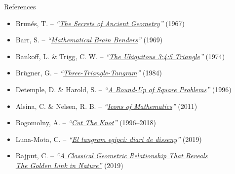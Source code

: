 \documentclass[14pt]{beamer}
\begin{document}

    \begin{frame}[t]{References}
        \begin{center}
            \bigskip
            {\footnotesize
            \begin{itemize}
                \item Brunés, T. -- \emph{``\href{https://books.google.es/books?id=L4pBPgAACAAJ}{The Secrets of Ancient Geometry}''} (1967)
                \item Barr, S. -- \emph{``\href{https://books.google.es/books?id=qTLbB08-kX0C}{Mathematical Brain Benders}''} (1969)
                \item Bankoff, L. \& Trigg, C. W. -- \emph{``\href{https://doi.org/10.2307/2688869}{The Ubiquitous 3:4:5 Triangle}''} (1974)
                \item Brügner, G. -- \emph{``\href{https://doi.org/10.1007/BF02136037}{Three-Triangle-Tangram}''} (1984)
                \item Detemple, D. \& Harold, S. -- \emph{``\href{https://doi.org/10.2307/2691390}{A Round-Up of Square Problems}''} (1996)
                \item Alsina, C. \& Nelsen, R. B. -- \emph{``\href{https://books.google.es/books?id=4DavMl7-aFgC}{Icons of Mathematics}''} (2011)
                \item Bogomolny, A. -- \emph{``\href{https://www.cut-the-knot.org/}{Cut The Knot}''} (1996--2018)
                \item Luna-Mota, C. -- \emph{``\href{https://publicacions.iec.cat/PopulaFitxa.do?idCatalogacio=33008}{El tangram egipci: diari de disseny}''}  (2019)
                \item Rajput, C. -- \emph{``\href{https://doi.org/10.24297/jam.v17i0.8498}{A Classical Geometric Relationship That Reveals}\\\qquad\qquad\qquad \href{https://doi.org/10.24297/jam.v17i0.8498}{The Golden Link in Nature''}} (2019)
            \end{itemize}}
            \bigskip\bigskip\bigskip\bigskip\bigskip
        \end{center}
    \end{frame}

\end{document}
